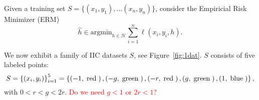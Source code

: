 \documentclass{article}
\def\H{\mathcal H}
\def\argmin{\mathrm{argmin}}
\newcommand{\comment}[1]{\textcolor{red}{#1}}
\begin{document}
Given a training set $S=\{(x_1,y_1), \ldots (x_n, y_n)\}$, consider the Empiricial Risk Minimizer (ERM)
\begin{equation}
\hat h \in \argmin_{h \in \H} \sum_{i=1}^n \ell(x_i, y_i, h).
\end{equation}

We now exhibit a family of IIC datasets $S$, see Figure~\ref{fig:1dat}.
$S$ consists of five labeled points:
\begin{equation}
S = \left\{\left(x_{i}, y_{i}\right)\right\}_{i=1}^{5} = \left\{\left(-1, \text{\;red\;}\right), \left(-g, \text{\;green\;}\right), \left(-r, \text{\;red\;}\right), \left(g, \text{\;green\;}\right), \left(1, \text{\;blue\;}\right)\right\},
\end{equation}
with $0< r  < g < 2 r.$
\comment{Do we need $g < 1$ or $2r <1$?}
\end{document}
